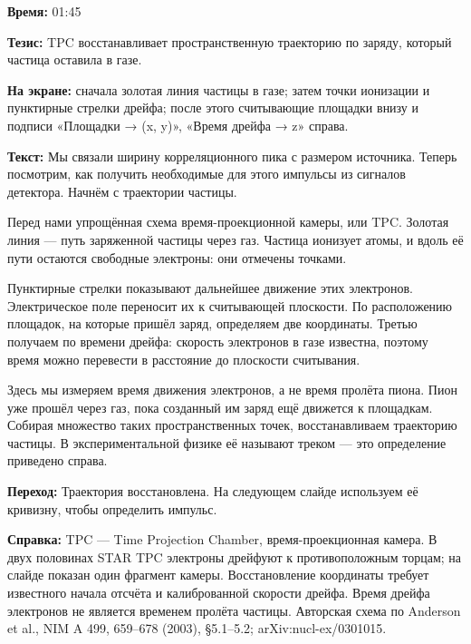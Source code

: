 \textbf{Время:} 01:45

\textbf{Тезис:} TPC восстанавливает пространственную траекторию по заряду, который частица оставила в газе.

\textbf{На экране:} сначала золотая линия частицы в газе; затем точки ионизации и пунктирные стрелки дрейфа; после этого считывающие площадки внизу и подписи «Площадки → (x, y)», «Время дрейфа → z» справа.

\textbf{Текст:} Мы связали ширину корреляционного пика с размером источника. Теперь посмотрим, как получить необходимые для этого импульсы из сигналов детектора. Начнём с траектории частицы.

Перед нами упрощённая схема время-проекционной камеры, или TPC. Золотая линия — путь заряженной частицы через газ. Частица ионизует атомы, и вдоль её пути остаются свободные электроны: они отмечены точками.

Пунктирные стрелки показывают дальнейшее движение этих электронов. Электрическое поле переносит их к считывающей плоскости. По расположению площадок, на которые пришёл заряд, определяем две координаты. Третью получаем по времени дрейфа: скорость электронов в газе известна, поэтому время можно перевести в расстояние до плоскости считывания.

Здесь мы измеряем время движения электронов, а не время пролёта пиона. Пион уже прошёл через газ, пока созданный им заряд ещё движется к площадкам. Собирая множество таких пространственных точек, восстанавливаем траекторию частицы. В экспериментальной физике её называют треком — это определение приведено справа.

\textbf{Переход:} Траектория восстановлена. На следующем слайде используем её кривизну, чтобы определить импульс.

\textbf{Справка:} TPC — Time Projection Chamber, время-проекционная камера. В двух половинах STAR TPC электроны дрейфуют к противоположным торцам; на слайде показан один фрагмент камеры. Восстановление координаты требует известного начала отсчёта и калиброванной скорости дрейфа. Время дрейфа электронов не является временем пролёта частицы. Авторская схема по Anderson et al., NIM A 499, 659–678 (2003), §5.1–5.2; arXiv:nucl-ex/0301015.
